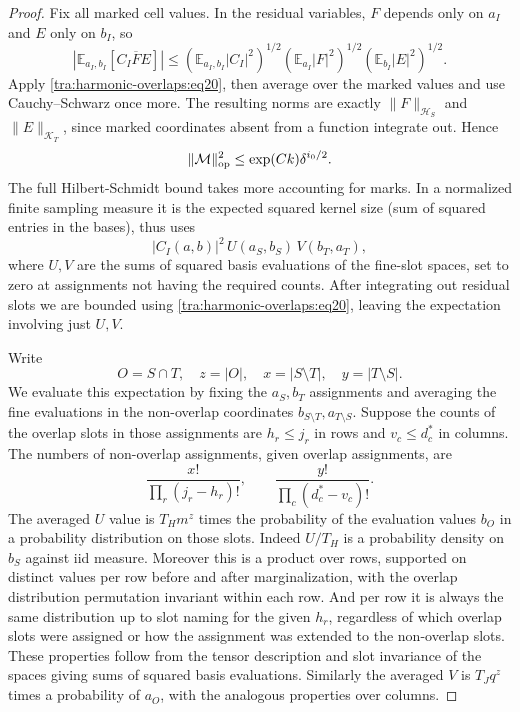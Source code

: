\begin{proof}
\label{tra:harmonic-overlaps:operator-bound-and-overlap-assignments}
Fix all marked cell values. In the residual variables, \(F\) depends only on \(a_I\) and \(E\) only on \(b_I\), so
\[
 \left|\mathbb E_{a_I,b_I}[C_I\overline FE]\right|
 \le\left(\mathbb E_{a_I,b_I}|C_I|^2\right)^{1/2}
     \left(\mathbb E_{a_I}|F|^2\right)^{1/2}
     \left(\mathbb E_{b_I}|E|^2\right)^{1/2}.
\]
Apply \eqref{tra:harmonic-overlaps:eq20}, then average over the marked values and use Cauchy--Schwarz once more. The resulting norms are exactly \(\|F\|_{\mathcal H_S}\) and \(\|E\|_{\mathcal K_T}\), since marked coordinates absent from a function integrate out. Hence
\begin{equation}
                         \|\mathcal M\|_{\rm op}^2
                                  \le \exp(Ck)\delta^{i_0/2}.             \label{tra:harmonic-overlaps:eq21}
\end{equation}
The full Hilbert-Schmidt bound takes more accounting for marks. In a normalized finite sampling measure it is the expected squared kernel size (sum of squared entries in the bases), thus uses
\begin{equation}
                 |C_I(a,b)|^2\, U(a_S,b_S)\, V(b_T,a_T),                 \label{tra:harmonic-overlaps:eq22}
\end{equation}
where \(U,V\) are the sums of squared basis evaluations of the fine-slot spaces, set to zero at assignments not having the required counts. After integrating out residual slots we are bounded using \eqref{tra:harmonic-overlaps:eq20}, leaving the expectation involving just \(U,V\).

Write
\[
                    O=S\cap T,\quad z=|O|,\quad
                    x=|S\setminus T|,\quad y=|T\setminus S|.
\]
We evaluate this expectation by fixing the \(a_S,b_T\) assignments and averaging the fine evaluations in the non-overlap coordinates \(b_{S\setminus T}, a_{T\setminus S}\). Suppose the counts of the overlap slots in those assignments are \(h_r\le j_r\) in rows and \(v_c\le d_c^*\) in columns. The numbers of non-overlap assignments, given overlap assignments, are
\begin{equation}
                       \frac{x!}{\prod_r(j_r-h_r)!},\qquad
                       \frac{y!}{\prod_c(d_c^*-v_c)!}.                   \label{tra:harmonic-overlaps:eq23}
\end{equation}
The averaged \(U\) value is \(T_H m^z\) times the probability of the evaluation values \(b_O\) in a probability distribution on those slots. Indeed \(U/T_H\) is a probability density on \(b_S\) against iid measure. Moreover this is a product over rows, supported on distinct values per row before and after marginalization, with the overlap distribution permutation invariant within each row. And per row it is always the same distribution up to slot naming for the given \(h_r\), regardless of which overlap slots were assigned or how the assignment was extended to the non-overlap slots. These properties follow from the tensor description and slot invariance of the spaces giving sums of squared basis evaluations. Similarly the averaged \(V\) is \(T_J q^z\) times a probability of \(a_O\), with the analogous properties over columns.


\end{proof}
